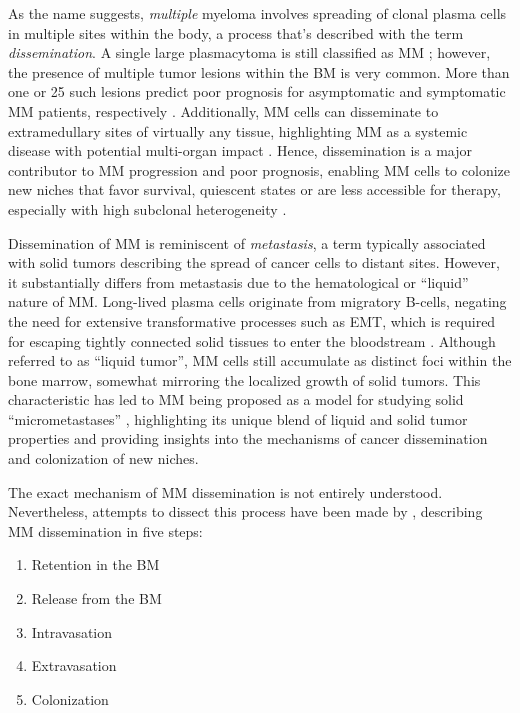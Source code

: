 %
\label{sec:intro_myeloma_dissemination}%
As the name suggests, \emph{multiple} myeloma involves spreading of clonal
plasma cells in multiple sites within the body, a process that's described with
the term \emph{dissemination}. A single large plasmacytoma is still classified
as \ac{MM} \cite{rajkumarInternationalMyelomaWorking2014}; however, the presence
of multiple tumor lesions within the \ac{BM} is very common. More than one or 25
such lesions predict poor prognosis for asymptomatic and symptomatic \ac{MM}
patients, respectively \cite{kastritisPrognosticImportancePresence2014,
    maiMagneticResonanceImagingbased2015a}. Additionally, \ac{MM} cells can
disseminate to extramedullary sites of virtually any tissue, highlighting
\ac{MM} as a systemic disease with potential multi-organ impact
\cite{rajkumarMultipleMyelomaCurrent2020,
    bladeExtramedullaryDiseaseMultiple2022}. Hence, dissemination is a major
contributor to \ac{MM} progression and poor prognosis, enabling \ac{MM} cells to
colonize new niches that favor survival, quiescent states or are less accessible
for therapy, especially with high subclonal heterogeneity
\cite{forsterMolecularImpactTumor2022, keatsClonalCompetitionAlternating2012}.

Dissemination of \ac{MM} is reminiscent of \emph{metastasis}, a term typically
associated with solid tumors describing the spread of cancer cells to distant
sites. However, it substantially differs from metastasis due to the
hematological or ``liquid'' nature of \ac{MM}. Long-lived plasma cells originate
from migratory B-cells, negating the need for extensive transformative processes
such as \ac{EMT}, which is required for escaping tightly connected solid tissues
to enter the bloodstream
\cite{ribattiEpithelialMesenchymalTransitionCancer2020}. Although referred to as
``liquid tumor'', \ac{MM} cells still accumulate as distinct foci within the
bone marrow, somewhat mirroring the localized growth of solid tumors. This
characteristic has led to \ac{MM} being proposed as a model for studying solid
``micrometastases'' \cite{ghobrialMyelomaModelProcess2012}, highlighting its
unique blend of liquid and solid tumor properties and providing insights into
the mechanisms of cancer dissemination and colonization of new niches.

The exact mechanism of \ac{MM} dissemination is not entirely understood.
Nevertheless, attempts to dissect this process have been made by
\citet{zeissigTumourDisseminationMultiple2020}, describing \ac{MM} dissemination
in five steps:
\begin{enumerate}
    \item Retention in the \ac{BM}
    \item Release from the \ac{BM}
    \item Intravasation
    \item Extravasation
    \item Colonization
\end{enumerate}


